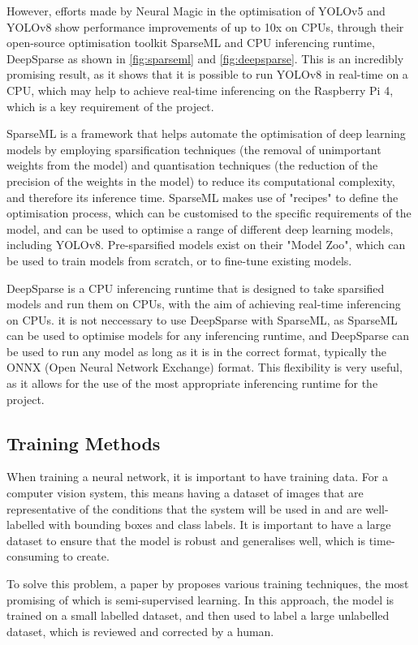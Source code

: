 However, efforts made by Neural Magic \cite{neuralmagic} in the optimisation of YOLOv5 and YOLOv8 show performance improvements of up to 10x on CPUs, through their open-source optimisation toolkit SparseML \cite{sparseml} and CPU inferencing runtime, DeepSparse \cite{deepsparse} as shown in \autoref{fig:sparseml} and \autoref{fig:deepsparse}. This is an incredibly promising result, as it shows that it is possible to run YOLOv8 in real-time on a CPU, which may help to achieve real-time inferencing on the Raspberry Pi 4, which is a key requirement of the project.

SparseML is a framework that helps automate the optimisation of deep learning models by employing sparsification techniques (the removal of unimportant weights from the model) and quantisation techniques (the reduction of the precision of the weights in the model) to reduce its computational complexity, and therefore its inference time. SparseML makes use of "recipes" to define the optimisation process, which can be customised to the specific requirements of the model, and can be used to optimise a range of different deep learning models, including YOLOv8. Pre-sparsified models exist on their "Model Zoo", which can be used to train models from scratch, or to fine-tune existing models.

DeepSparse is a CPU inferencing runtime that is designed to take sparsified models and run them on CPUs, with the aim of achieving real-time inferencing on CPUs. it is not neccessary to use DeepSparse with SparseML, as SparseML can be used to optimise models for any inferencing runtime, and DeepSparse can be used to run any model as long as it is in the correct format, typically the ONNX (Open Neural Network Exchange) format. This flexibility is very useful, as it allows for the use of the most appropriate inferencing runtime for the project.

\subsection{Training Methods}
When training a neural network, it is important to have training data. For a computer vision system, this means having a dataset of images that are representative of the conditions that the system will be used in and are well-labelled with bounding boxes and class labels. It is important to have a large dataset to ensure that the model is robust and generalises well, which is time-consuming to create.

To solve this problem, a paper by \citet{Yang_2023} proposes various training techniques, the most promising of which is semi-supervised learning. In this approach, the model is trained on a small labelled dataset, and then used to label a large unlabelled dataset, which is reviewed and corrected by a human.

